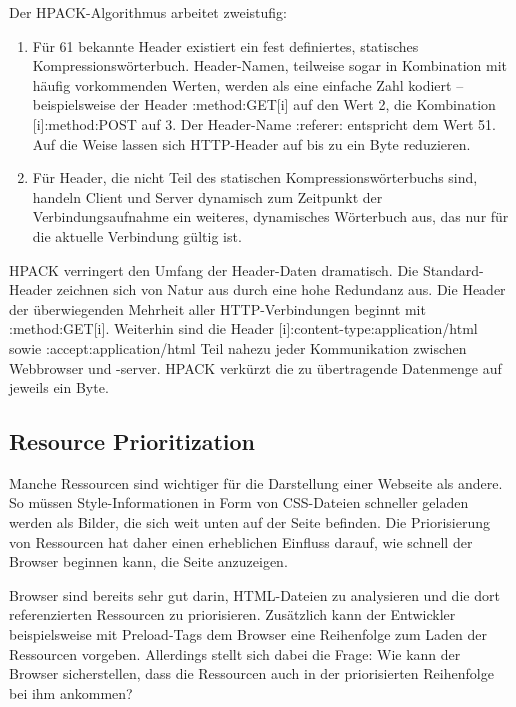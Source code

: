 \documentclass[a4paper, justified, notoc]{tufte-handout} %
\begin{document}
Der HPACK-Algorithmus arbeitet zweistufig:
\begin{enumerate}
	\item Für 61 bekannte Header existiert ein fest definiertes, statisches Kompressionswörterbuch. Header-Namen, teilweise sogar in Kombination mit häufig vorkommenden Werten, werden als eine einfache Zahl kodiert – beispielsweise der Header :method:GET[i] auf den Wert 2, die Kombination [i]:method:POST auf 3. Der Header-Name :referer: entspricht dem Wert 51. Auf die Weise lassen sich HTTP-Header auf bis zu ein Byte reduzieren.
	\item Für Header, die nicht Teil des statischen Kompressionswörterbuchs sind, handeln Client und Server dynamisch zum Zeitpunkt der Verbindungsaufnahme ein weiteres, dynamisches Wörterbuch aus, das nur für die aktuelle Verbindung gültig ist.
\end{enumerate}

HPACK verringert den Umfang der Header-Daten dramatisch. Die Standard-Header zeichnen sich von Natur aus durch eine hohe Redundanz aus. Die Header der überwiegenden Mehrheit aller HTTP-Verbindungen beginnt mit :method:GET[i]. Weiterhin sind die Header [i]:content-type:application/html sowie :accept:application/html Teil nahezu jeder Kommunikation zwischen Webbrowser und -server. HPACK verkürzt die zu übertragende Datenmenge auf jeweils ein Byte.




\subsection{Resource Prioritization} %
\label{sub:resource_prioritization}

Manche Ressourcen sind wichtiger für die Darstellung einer Webseite als andere. So müssen Style-Informationen in Form von CSS-Dateien schneller geladen werden als Bilder, die sich weit unten auf der Seite befinden. Die Priorisierung von Ressourcen hat daher einen erheblichen Einfluss darauf, wie schnell der Browser beginnen kann, die Seite anzuzeigen.

Browser sind bereits sehr gut darin, HTML-Dateien zu analysieren und die dort referenzierten Ressourcen zu priorisieren. Zusätzlich kann der Entwickler beispielsweise mit Preload-Tags dem Browser eine Reihenfolge zum Laden der Ressourcen vorgeben. Allerdings stellt sich dabei die Frage: Wie kann der Browser sicherstellen, dass die Ressourcen auch in der priorisierten Reihenfolge bei ihm ankommen?
\end{document}
